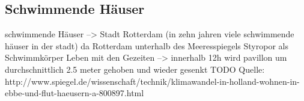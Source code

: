 \subsection{Schwimmende Häuser}
schwimmende Häuser
--> Stadt Rotterdam	(in zehn jahren viele schwimmende häuser in der stadt)
da Rotterdam unterhalb des Meeresspiegels
\newline\newline
Styropor als Schwimmkörper
\newline\newline
Leben mit den Gezeiten
--> innerhalb 12h wird pavillon um durchschnittlich 2.5 meter gehoben und wieder gesenkt
\newline\newline
TODO
Quelle: http://www.spiegel.de/wissenschaft/technik/klimawandel-in-holland-wohnen-in-ebbe-und-flut-haeusern-a-800897.html
